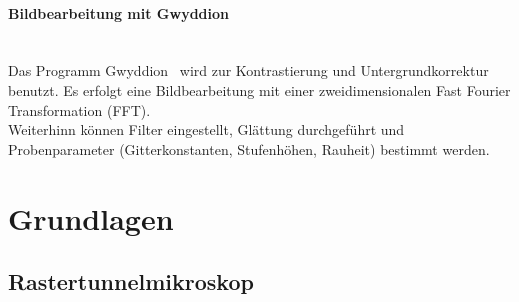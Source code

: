 \documentclass[a4paper,twoside,final]{article}
\begin{document}
\paragraph{Bildbearbeitung mit Gwyddion}$~$\\
Das Programm Gwyddion~\cite{Gwyddion} wird zur Kontrastierung und Untergrundkorrektur benutzt. Es erfolgt eine Bildbearbeitung mit einer zweidimensionalen Fast Fourier Transformation (FFT).\\
Weiterhinn können Filter eingestellt, Glättung durchgeführt und Probenparameter (Gitterkonstanten, Stufenhöhen, Rauheit) bestimmt werden.

\newpage
\section{Grundlagen} \label{sec:Grundlagen}
\subsection{Rastertunnelmikroskop}
\end{document}
